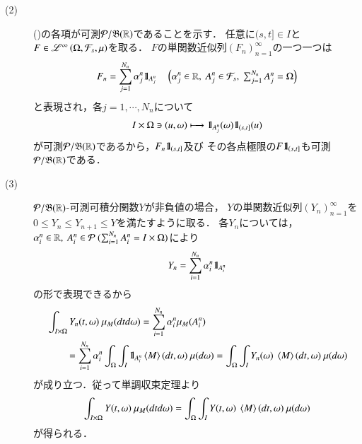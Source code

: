 \begin{prf}
\begin{description}
			\item[(2)] 
				()の各項が可測$\mathcal{P}/\mathfrak{B}(\mathbb{R})$であることを示す．
				任意に$(s,t] \in I$と$F \in \mathscr{L}^{\infty} \left(\Omega,\mathcal{F}_s,\mu\right)$を取る．
				$F$の単関数近似列$(F_n)_{n=1}^{\infty}$の一つ一つは
				\begin{align}
					F_n = \sum_{j=1}^{N_n} \alpha_j^n \defunc_{A_j^n} \quad \left( \alpha_j^n \in \R,\ A_j^n \in \mathcal{F}_s,\ \mbox{$\sum_{j=1}^{N_n}A_j^n = \Omega$} \right)
				\end{align}
				と表現され，各$j=1,\cdots,N_n$について
				\begin{align}
					I \times \Omega \ni (u,\omega) \longmapsto \mbox{1}\hspace{-0.25em}\mbox{l}_{A_j^n}(\omega) \mbox{1}\hspace{-0.25em}\mbox{l}_{(s,t]}(u)
				\end{align}
				が可測$\mathcal{P}/\mathfrak{B}(\mathbb{R})$であるから，$F_n \mbox{1}\hspace{-0.25em}\mbox{l}_{(s,t]}$及び
				その各点極限の$F \mbox{1}\hspace{-0.25em}\mbox{l}_{(s,t]}$も可測$\mathcal{P}/\mathfrak{B}(\mathbb{R})$である．
			
			\item[(3)] $\mathcal{P}/\mathfrak{B}(\mathbb{R})$-可測可積分関数$Y$が非負値の場合，
				$Y$の単関数近似列$(Y_n)_{n=1}^{\infty}$を$0 \leq Y_n \leq Y_{n+1} \leq Y$を満たすように取る．
				各$Y_n$については，$\alpha_i^n \in \R,\ A_i^n \in \mathcal{P}\ (\sum_{i=1}^{N_n} A_i^n = I \times \Omega)$により
				\begin{align}
					Y_n = \sum_{i=1}^{N_n} \alpha_i^n \mbox{1}\hspace{-0.25em}\mbox{l}_{A_i^n}
				\end{align}
				の形で表現できるから
				\begin{align}
					&\int_{I \times \Omega} Y_n(t,\omega)\ \mu_M(dt d\omega)
					= \sum_{i=1}^{N_n} \alpha_i^n \mu_M(A_i^n) \\
					&\qquad = \sum_{i=1}^{N_n} \alpha_i^n \int_\Omega \int_I \defunc_{A_i^n} \inprod<M>(dt,\omega)\ \mu(d\omega)
					= \int_\Omega \int_I Y_n(\omega)\ \inprod<M>(dt,\omega)\ \mu(d\omega)
				\end{align}
				が成り立つ．従って単調収束定理より
				\begin{align}
					\int_{I \times \Omega} Y(t,\omega)\ \mu_M(dt d\omega)
					= \int_\Omega \int_I Y(t,\omega)\ \inprod<M>(dt,\omega)\ \mu(d\omega)
				\end{align}
				が得られる．
				

\end{description}
\end{prf}
